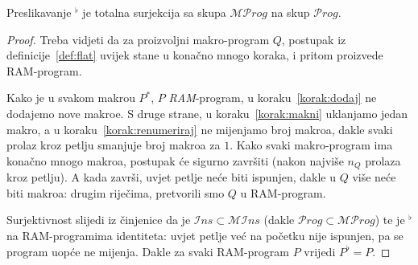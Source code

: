 \begin{propozicija}[{name=[spljoštenje projicira $\mathscr{MP}rog$ na $\mathscr Prog$]}]
Preslikavanje ${}^\flat$ je totalna surjekcija sa skupa $\mathscr{MP}rog$ na skup $\mathscr Prog$.
\end{propozicija}
\begin{proof}
Treba vidjeti da za proizvoljni makro-program $Q$, postupak iz definicije~\ref{def:flat} uvijek stane u konačno mnogo koraka, i pritom proizvede RAM-program.

Kako je u svakom makrou $P^*$, $P$ \emph{RAM}-program, u koraku~\ref{korak:dodaj} ne dodajemo nove makroe. S druge strane, u koraku~\ref{korak:makni} uklanjamo jedan makro, a u koraku~\ref{korak:renumeriraj} ne mijenjamo broj makroa, dakle svaki prolaz kroz petlju smanjuje broj makroa za $1$. Kako svaki makro-program ima konačno mnogo makroa, postupak će sigurno završiti (nakon najviše $n_Q$ prolaza kroz petlju). A kada završi, uvjet petlje neće biti ispunjen, dakle u $Q$ više neće biti makroa: drugim riječima, pretvorili smo  $Q$ u RAM-program.

    Surjektivnost slijedi iz činjenice da je $\mathscr Ins\subset\mathscr{MI}ns$ (dakle $\mathscr Prog\subset\mathscr{MP}rog$) te je ${}^\flat$ na RAM-programima identiteta: uvjet petlje već na početku nije ispunjen, pa se program uopće ne mijenja. Dakle za svaki RAM-program $P$ vrijedi $P^\flat=P$.
\end{proof}

